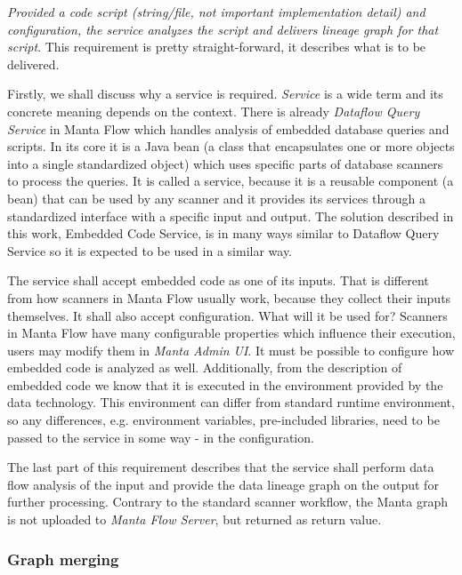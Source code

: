 \textit{Provided a code script (string/file, not important implementation detail) and configuration, the service analyzes the script and delivers lineage graph for that script}. This requirement is pretty straight-forward, it describes what is to be delivered.
\par
Firstly, we shall discuss why a service is required. \textit{Service} is a wide term and its concrete meaning depends on the context. There is already \textit{Dataflow Query Service} in Manta Flow which handles analysis of embedded database queries and scripts. In its core it is a Java bean (a class that encapsulates one or more objects into a single standardized object) which uses specific parts of database scanners to process the queries. It is called a service, because it is a reusable component (a bean) that can be used by any scanner and it provides its services through a standardized interface with a specific input and output. The solution described in this work, Embedded Code Service, is in many ways similar to Dataflow Query Service so it is expected to be used in a similar way.
\par
The service shall accept embedded code as one of its inputs. That is different from how scanners in Manta Flow usually work, because they collect their inputs themselves. It shall also accept configuration. What will it be used for? Scanners in Manta Flow have many configurable properties which influence their execution, users may modify them in \textit{Manta Admin UI}. It must be possible to configure how embedded code is analyzed as well. Additionally, from the description of embedded code we know that it is executed in the environment provided by the data technology. This environment can differ from standard runtime environment, so any differences, e.g. environment variables, pre-included libraries, need to be passed to the service in some way - in the configuration.
\par
The last part of this requirement describes that the service shall perform data flow analysis of the input and provide the data lineage graph on the output for further processing. Contrary to the standard scanner workflow, the Manta graph is not uploaded to \textit{Manta Flow Server}, but returned as return value.

\subsubsection{Graph merging}

